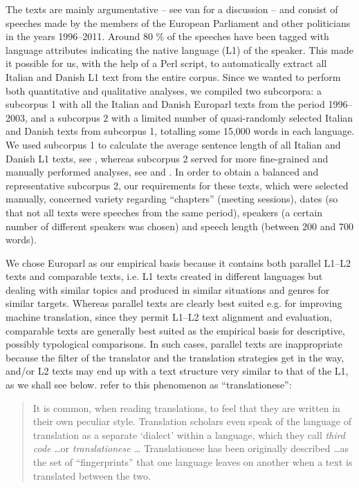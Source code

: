 \documentclass[output=paper]{LSP/langsci}
\begin{document}
The texts are mainly argumentative -- see van \citet{Halteren2008} for a discussion -- and consist of speeches made by the members of the European Parliament and other politicians in the years 1996--2011. Around 80 \% of the speeches have been tagged with language attributes indicating the native language (L1) of the speaker. This made it possible for us, with the help of a Perl script, to automatically extract all Italian and Danish L1 text from the entire corpus. Since we wanted to perform both quantitative and qualitative analyses, we compiled two subcorpora: a subcorpus 1 with all the Italian and Danish Europarl texts from the period 1996--2003, and a subcorpus 2 with a limited number of quasi-randomly selected Italian and Danish texts from subcorpus 1, totalling some 15,000 words in each language. We used subcorpus 1 to calculate the average sentence length of all Italian and Danish L1 texts, see , whereas subcorpus 2 served for more fine-grained and manually performed analyses, see  and . In order to obtain a balanced and representative subcorpus 2, our requirements for these texts, which were selected manually, concerned variety regarding ``chapters'' (meeting sessions), dates (so that not all texts were speeches from the same period), speakers (a certain number of different speakers was chosen) and speech length (between 200 and 700 words).

We chose Europarl as our empirical basis because it contains both parallel L1--L2 texts and comparable texts, i.e. L1 texts created in different languages but dealing with similar topics and produced in similar situations and genres for similar targets. Whereas parallel texts are clearly best suited e.g. for improving machine translation, since they permit L1--L2 text alignment and evaluation, comparable texts are generally best suited as the empirical basis for descriptive, possibly typological comparisons. In such cases, parallel texts are inappropriate because the filter of the translator and the translation strategies get in the way, and/or L2 texts may end up with a text structure very similar to that of the L1, as we shall see below. \citet[260]{Baroni2006} refer to this phenomenon as ``translationese'': 

\begin{quote}
It is common, when reading translations, to feel that they are written in their own peculiar style. Translation scholars even speak of the language of translation as a separate `dialect' within a language, which they call \textit{third code} \ldots or \textit{translationese \ldots } Translationese has been originally described \ldots  as the set of ``fingerprints'' that one language leaves on another when a text is translated between the two. 
\end{quote}
\end{document}
